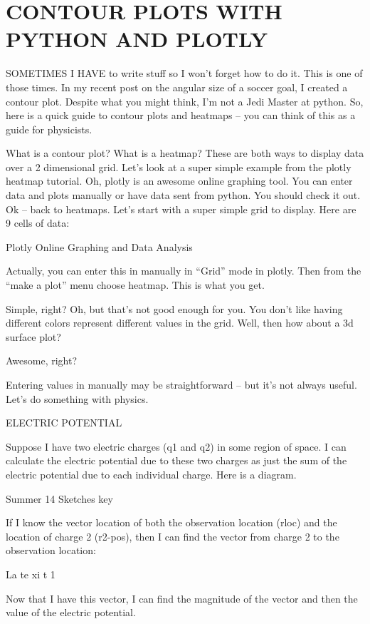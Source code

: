 
\section{CONTOUR PLOTS WITH PYTHON AND PLOTLY}

SOMETIMES I HAVE to write stuff so I won’t forget how to do it. This is one of those times. In my recent post on the angular size of a soccer goal, I created a contour plot. Despite what you might think, I’m not a Jedi Master at python. So, here is a quick guide to contour plots and heatmaps – you can think of this as a guide for physicists.

What is a contour plot? What is a heatmap? These are both ways to display data over a 2 dimensional grid. Let’s look at a super simple example from the plotly heatmap tutorial. Oh, plotly is an awesome online graphing tool. You can enter data and plots manually or have data sent from python. You should check it out. Ok – back to heatmaps. Let’s start with a super simple grid to display. Here are 9 cells of data:

Plotly   Online Graphing and Data Analysis

Actually, you can enter this in manually in “Grid” mode in plotly. Then from the “make a plot” menu choose heatmap. This is what you get.


Simple, right? Oh, but that’s not good enough for you. You don’t like having different colors represent different values in the grid. Well, then how about a 3d surface plot?


Awesome, right?

Entering values in manually may be straightforward – but it’s not always useful. Let’s do something with physics.

ELECTRIC POTENTIAL

Suppose I have two electric charges (q1 and q2) in some region of space. I can calculate the electric potential due to these two charges as just the sum of the electric potential due to each individual charge. Here is a diagram.

Summer 14 Sketches key

If I know the vector location of both the observation location (rloc) and the location of charge 2 (r2-pos), then I can find the vector from charge 2 to the observation location:

La te xi t 1

Now that I have this vector, I can find the magnitude of the vector and then the value of the electric potential.

